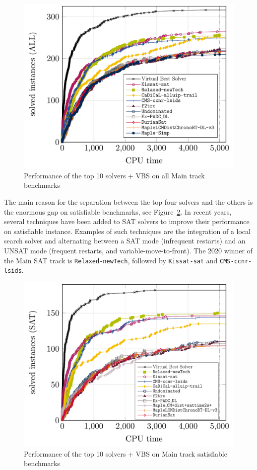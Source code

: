 \documentclass{elsarticle}
\newcommand{\solver}[1]{\texttt{#1}}
\begin{document}
\begin{figure}[ht]
\centering
\includegraphics[width=.9\textwidth]{img/paper-main-top10-ALL.pdf}
\caption{Performance of the top 10 solvers + VBS on all  Main track benchmarks}
\label{main:all}
\end{figure}


The main reason for the separation between the top four solvers and the others is the enormous gap on satisfiable benchmarks, 
see Figure~\ref{main:sat}. In recent years, several techniques have been added to SAT solvers to improve
their performance on satisfiable instance. Examples of such techniques are the integration of a local search
solver and alternating between a SAT mode (infrequent restarts) and an UNSAT mode (frequent restarts,
and variable-move-to-front). The 2020 winner of the Main SAT track is \solver{Relaxed-newTech}, followed by 
\solver{Kissat-sat} and \solver{CMS-ccnr-lsids}.

\begin{figure}[ht]
\centering
\includegraphics[width=.9\textwidth]{img/paper-main-top10-SAT.pdf}
\caption{Performance of the top 10 solvers + VBS on Main track satisfiable benchmarks}
\label{main:sat}
\end{figure}
\end{document}
